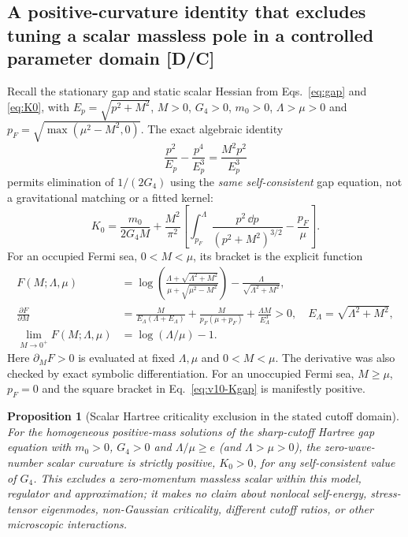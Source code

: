 \documentclass[11pt,a4paper]{article}
\newtheorem{proposition}{Proposition}[section]\newtheorem{lemma}[proposition]{Lemma}\newtheorem{definition}[proposition]{Definition}\newtheorem{remark}[proposition]{Remark}
\begin{document}
\subsection{A positive-curvature identity that excludes tuning a scalar massless pole in a controlled parameter domain [D/C]}\label{sec:v10-positive}
Recall the stationary gap and static scalar Hessian from Eqs.~\eqref{eq:gap} and \eqref{eq:K0}, with $E_p=\sqrt{p^2+M^2}$, $M>0$, $G_4>0$, $m_0>0$, $\Lambda>\mu>0$ and $p_F=\sqrt{\max(\mu^2-M^2,0)}$. The exact algebraic identity
\begin{equation}\label{eq:v10-gap-identity}
\frac{p^2}{E_p}-\frac{p^4}{E_p^3}=\frac{M^2p^2}{E_p^3}
\end{equation}
permits elimination of $1/(2G_4)$ using the \emph{same self-consistent} gap equation, not a gravitational matching or a fitted kernel:
\begin{equation}\label{eq:v10-Kgap}
\boxed{K_0=\frac{m_0}{2G_4M}+\frac{M^2}{\pi^2}\left[\int_{p_F}^{\Lambda}\frac{p^2\,\dd p}{(p^2+M^2)^{3/2}}-\frac{p_F}{\mu}\right].}
\end{equation}
For an occupied Fermi sea, $0<M<\mu$, its bracket is the explicit function
\begin{align}\label{eq:v10-F-def}
F(M;\Lambda,\mu)&=\log\!\left(\frac{\Lambda+\sqrt{\Lambda^2+M^2}}{\mu+\sqrt{\mu^2-M^2}}\right)-\frac{\Lambda}{\sqrt{\Lambda^2+M^2}},\\
\frac{\partial F}{\partial M}
&=\frac{M}{E_\Lambda(\Lambda+E_\Lambda)}+\frac{M}{p_F(\mu+p_F)}+\frac{\Lambda M}{E_\Lambda^3}>0,
\quad E_\Lambda=\sqrt{\Lambda^2+M^2},\label{eq:v10-F-prime}\\
\lim_{M\to0^+}F(M;\Lambda,\mu)&=\log(\Lambda/\mu)-1.\label{eq:v10-F-limit}
\end{align}
Here $\partial_M F>0$ is evaluated at fixed $\Lambda,\mu$ and $0<M<\mu$. The derivative was also checked by exact symbolic differentiation. For an unoccupied Fermi sea, $M\ge\mu$, $p_F=0$ and the square bracket in Eq.~\eqref{eq:v10-Kgap} is manifestly positive.
\begin{proposition}[Scalar Hartree criticality exclusion in the stated cutoff domain]\label{prop:v10-positivity}
For the homogeneous positive-mass solutions of the sharp-cutoff Hartree gap equation with $m_0>0$, $G_4>0$ and $\Lambda/\mu\ge e$ (and $\Lambda>\mu>0$), the zero-wave-number scalar curvature is \emph{strictly positive}, $K_0>0$, for any self-consistent value of $G_4$. This excludes a zero-momentum massless scalar \emph{within this model, regulator and approximation}; it makes no claim about nonlocal self-energy, stress-tensor eigenmodes, non-Gaussian criticality, different cutoff ratios, or other microscopic interactions.
\end{proposition}
\end{document}
